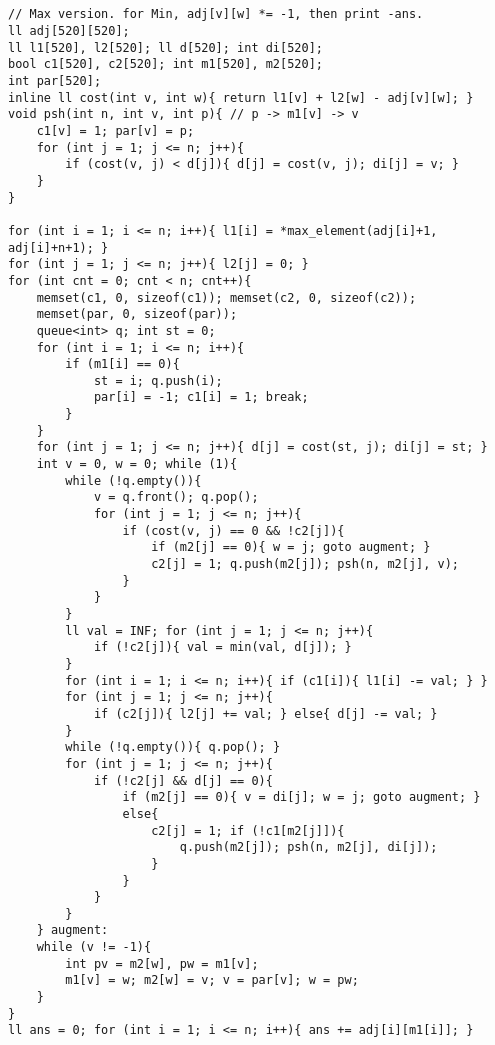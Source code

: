 \documentclass[landscape, 8pt, a4paper, oneside, twocolumn]{extarticle}
\begin{document}
\subsection{}
\begin{verbatim}
// Max version. for Min, adj[v][w] *= -1, then print -ans.
ll adj[520][520];
ll l1[520], l2[520]; ll d[520]; int di[520];
bool c1[520], c2[520]; int m1[520], m2[520];
int par[520];
inline ll cost(int v, int w){ return l1[v] + l2[w] - adj[v][w]; }
void psh(int n, int v, int p){ // p -> m1[v] -> v
    c1[v] = 1; par[v] = p;
    for (int j = 1; j <= n; j++){
        if (cost(v, j) < d[j]){ d[j] = cost(v, j); di[j] = v; }
    }
}

for (int i = 1; i <= n; i++){ l1[i] = *max_element(adj[i]+1, adj[i]+n+1); }
for (int j = 1; j <= n; j++){ l2[j] = 0; }
for (int cnt = 0; cnt < n; cnt++){
    memset(c1, 0, sizeof(c1)); memset(c2, 0, sizeof(c2));
    memset(par, 0, sizeof(par));
    queue<int> q; int st = 0;
    for (int i = 1; i <= n; i++){
        if (m1[i] == 0){
            st = i; q.push(i);
            par[i] = -1; c1[i] = 1; break;
        }
    }
    for (int j = 1; j <= n; j++){ d[j] = cost(st, j); di[j] = st; }
    int v = 0, w = 0; while (1){
        while (!q.empty()){
            v = q.front(); q.pop();
            for (int j = 1; j <= n; j++){
                if (cost(v, j) == 0 && !c2[j]){
                    if (m2[j] == 0){ w = j; goto augment; }
                    c2[j] = 1; q.push(m2[j]); psh(n, m2[j], v);
                }
            }
        }
        ll val = INF; for (int j = 1; j <= n; j++){
            if (!c2[j]){ val = min(val, d[j]); }
        }
        for (int i = 1; i <= n; i++){ if (c1[i]){ l1[i] -= val; } }
        for (int j = 1; j <= n; j++){
            if (c2[j]){ l2[j] += val; } else{ d[j] -= val; }
        }
        while (!q.empty()){ q.pop(); }
        for (int j = 1; j <= n; j++){
            if (!c2[j] && d[j] == 0){
                if (m2[j] == 0){ v = di[j]; w = j; goto augment; }
                else{
                    c2[j] = 1; if (!c1[m2[j]]){
                        q.push(m2[j]); psh(n, m2[j], di[j]);
                    }
                }
            }
        }
    } augment:
    while (v != -1){
        int pv = m2[w], pw = m1[v];
        m1[v] = w; m2[w] = v; v = par[v]; w = pw;
    }
}
ll ans = 0; for (int i = 1; i <= n; i++){ ans += adj[i][m1[i]]; }
\end{verbatim}
\end{document}
